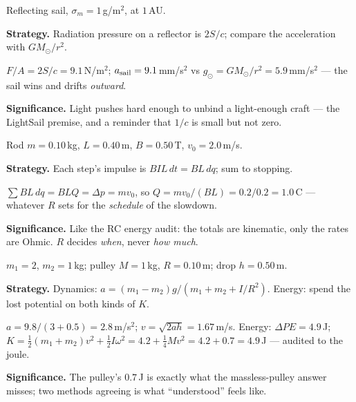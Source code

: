 \begin{example}\label{ex:w26}
Reflecting sail, $\sigma_m=1$\,g/m$^{2}$, at $1$\,AU.
\par\smallskip
\textbf{Strategy.} Radiation pressure on a reflector is $2S/c$;
compare the acceleration with $GM_\odot/r^{2}$.
\begin{solution}
$F/A=2S/c=9.1$\,\textmu N/m$^{2}$; $a_{\rm sail}=9.1$\,mm/s$^{2}$
vs $g_\odot=GM_\odot/r^{2}=5.9$\,mm/s$^{2}$ --- the sail wins and
drifts \emph{outward}. \checkmark
\end{solution}
\textbf{Significance.} Light pushes hard enough to unbind a
light-enough craft --- the LightSail premise, and a reminder that
$1/c$ is small but not zero.
\end{example}

\begin{example}\label{ex:w27}
Rod $m=0.10$\,kg, $L=0.40$\,m, $B=0.50$\,T, $v_0=2.0$\,m/s.
\par\smallskip
\textbf{Strategy.} Each step's impulse is $BIL\,dt=BL\,dq$; sum to
stopping.
\begin{solution}
$\sum BL\,dq=BLQ=\Delta p=mv_0$, so
$Q=mv_0/(BL)=0.2/0.2=1.0$\,C --- whatever $R$ sets for the
\emph{schedule} of the slowdown. \checkmark
\end{solution}
\textbf{Significance.} Like the RC energy audit: the totals are
kinematic, only the rates are Ohmic. $R$ decides \emph{when}, never
\emph{how much}.
\end{example}

\begin{example}\label{ex:w28}
$m_1=2$, $m_2=1$\,kg; pulley $M=1$\,kg, $R=0.10$\,m; drop
$h=0.50$\,m.
\par\smallskip
\textbf{Strategy.} Dynamics: $a=(m_1-m_2)g/(m_1+m_2+I/R^{2})$.
Energy: spend the lost potential on both kinds of $K$.
\begin{solution}
$a=9.8/(3+0.5)=2.8$\,m/s$^{2}$; $v=\sqrt{2ah}=1.67$\,m/s.
Energy: $\Delta PE=4.9$\,J;
$K=\tfrac12(m_1+m_2)v^{2}+\tfrac12I\omega^{2}
=4.2+\tfrac14Mv^{2}=4.2+0.7=4.9$\,J --- audited to the joule.
\checkmark
\end{solution}
\textbf{Significance.} The pulley's $0.7$\,J is exactly what the
massless-pulley answer misses; two methods agreeing is what
``understood'' feels like.
\end{example}

